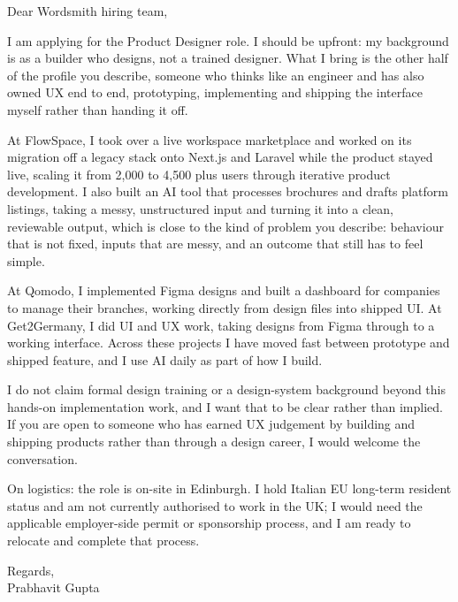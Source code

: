 \documentclass[a4paper,11pt]{article}
\begin{document}
Dear Wordsmith hiring team,

I am applying for the Product Designer role. I should be upfront: my background is as a builder who designs, not a trained designer. What I bring is the other half of the profile you describe, someone who thinks like an engineer and has also owned UX end to end, prototyping, implementing and shipping the interface myself rather than handing it off.

At FlowSpace, I took over a live workspace marketplace and worked on its migration off a legacy stack onto Next.js and Laravel while the product stayed live, scaling it from 2,000 to 4,500 plus users through iterative product development. I also built an AI tool that processes brochures and drafts platform listings, taking a messy, unstructured input and turning it into a clean, reviewable output, which is close to the kind of problem you describe: behaviour that is not fixed, inputs that are messy, and an outcome that still has to feel simple.

At Qomodo, I implemented Figma designs and built a dashboard for companies to manage their branches, working directly from design files into shipped UI. At Get2Germany, I did UI and UX work, taking designs from Figma through to a working interface. Across these projects I have moved fast between prototype and shipped feature, and I use AI daily as part of how I build.

I do not claim formal design training or a design-system background beyond this hands-on implementation work, and I want that to be clear rather than implied. If you are open to someone who has earned UX judgement by building and shipping products rather than through a design career, I would welcome the conversation.

On logistics: the role is on-site in Edinburgh. I hold Italian EU long-term resident status and am not currently authorised to work in the UK; I would need the applicable employer-side permit or sponsorship process, and I am ready to relocate and complete that process.

Regards,\\
Prabhavit Gupta
\end{document}
